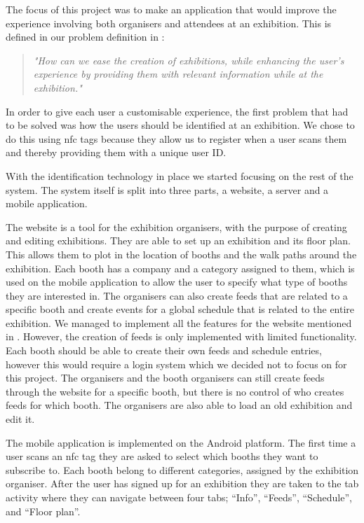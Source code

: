 The focus of this project was to make an application that would improve the experience involving both organisers and attendees at an exhibition.
This is defined in our problem definition in :
\begin{quote}
\textit{"How can we ease the creation of exhibitions, while enhancing the user's experience by providing them with relevant information while at the exhibition."}
\end{quote}
In order to give each user a customisable experience, the first problem that had to be solved was how the users should be identified at an exhibition. We chose to do this using \ac{nfc} tags because they allow us to register when a user scans them and thereby providing them with a unique user ID.
 
With the identification technology in place we started focusing on the rest of the system. The system itself is split into three parts, a website, a server and a mobile application.

The website is a tool for the exhibition organisers, with the purpose of creating and editing exhibitions. They are able to set up an exhibition and its floor plan. This allows them to plot in the location of booths and the walk paths around the exhibition. Each booth has a company and a category assigned to them, which is used on the mobile application to allow the user to specify what type of booths they are interested in. The organisers can also create feeds that are related to a specific booth and create events for a global schedule that is related to the entire exhibition. We managed to implement all the features for the website mentioned in . However, the creation of feeds is only implemented with limited functionality. Each booth should be able to create their own feeds and schedule entries, however this would require a login system which we decided not to focus on for this project. The organisers and the booth organisers can still create feeds through the website for a specific booth, but there is no control of who creates feeds for which booth. The organisers are also able to load an old exhibition and edit it.

The mobile application is implemented on the Android platform. The first time a user scans an \ac{nfc} tag they are asked to select which booths they want to subscribe to. Each booth belong to different categories, assigned by the exhibition organiser. After the user has signed up for an exhibition they are taken to the tab activity where they can navigate between four tabs; ``Info'', ``Feeds'', ``Schedule'', and ``Floor plan''.

